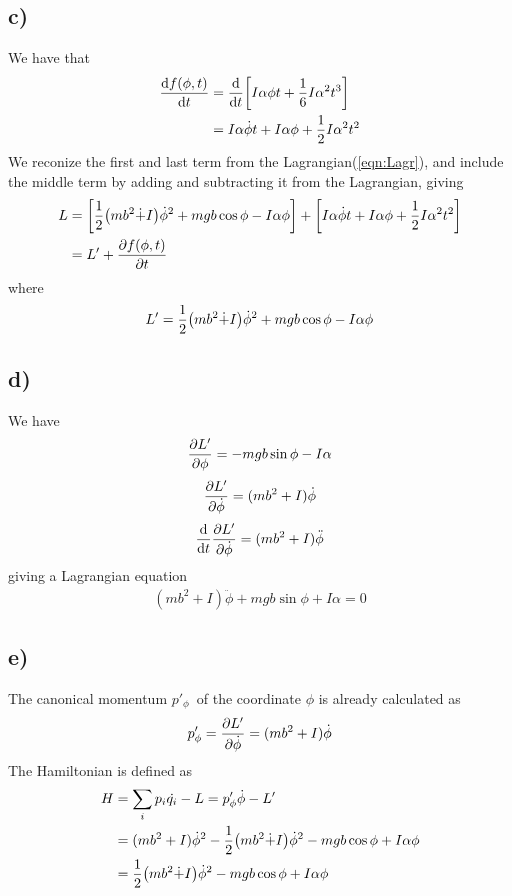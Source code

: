 \documentclass[12p,a4paper]{article}
\newcommand{\half}{\frac{1}{2}}
\begin{document}
\subsection*{c)}
We have that
\begin{align*}
    \dv{f(\phi, t)}{t} &= \dv{t}\qty[I\alpha\phi t + \frac{1}{6} I \alpha^2t^3] \\
    &= I\alpha\dot{\phi}t + I\alpha\phi + \half I \alpha^2t^2
\end{align*}
We reconize the first and last term from the Lagrangian(\ref{eqn:Lagr}), and include the middle term by adding and subtracting it from the Lagrangian, giving
\begin{align*}
    L &= \qty[ \half \qty(m b^2\dot + I)\dot{\phi}^2 + mgb\cos{\phi} - I\alpha\phi ] + \qty[ I\alpha\dot{\phi}t + I\alpha\phi + \half I \alpha^2t^2 ] \\
    &= L' + \pdv{f(\phi, t)}{t}
\end{align*}
where
\begin{align*}
    L' = \half \qty(m b^2\dot + I)\dot{\phi}^2 + mgb\cos{\phi} - I\alpha\phi
\end{align*}


\subsection*{d)}
We have
\begin{align*}
    \pdv{L'}{\phi} = -mgb\sin{\phi} - I\alpha
\end{align*}
\begin{align*}
    \pdv{L'}{\dot{\phi}} = (mb^2 + I)\dot{\phi}
\end{align*}
\begin{align*}
    \dv{t}\pdv{L'}{\dot{\phi}} = (mb^2 + I)\ddot{\phi}
\end{align*}
giving a Lagrangian equation
\begin{align*}
    (mb^2 + I)\ddot{\phi} + mgb\sin{\phi} + I\alpha = 0
\end{align*}


\subsection*{e)}
The canonical momentum $p'_\phi$ of the coordinate $\phi$ is already calculated as
\begin{align*}
    p'_\phi = \pdv{L'}{\dot{\phi}} = (mb^2 + I)\dot{\phi}
\end{align*}
The Hamiltonian is defined as
\begin{align*}
    H &= \sum_i p_i \dot{q_i} - L = p'_\phi \dot{\phi} - L' \\
    &= (mb^2 + I)\dot{\phi}^2 - \half \qty(m b^2\dot + I)\dot{\phi}^2 - mgb\cos{\phi} + I\alpha\phi \\
    &= \half \qty(m b^2\dot + I)\dot{\phi}^2 - mgb\cos{\phi} + I\alpha\phi
\end{align*}
\end{document}

